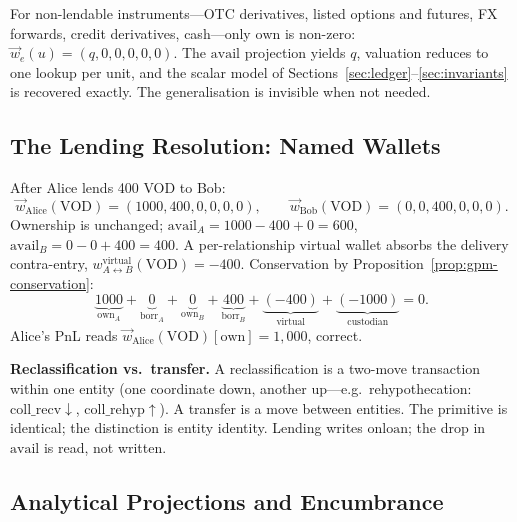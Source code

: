 \begin{remark}
For non-lendable instruments---OTC derivatives, listed options and futures, FX forwards, credit derivatives, cash---only $\mathrm{own}$ is non-zero: $\vec{w}_e(u) = (q,0,0,0,0,0)$. The $\mathrm{avail}$ projection yields $q$, valuation reduces to one lookup per unit, and the scalar model of Sections~\ref{sec:ledger}--\ref{sec:invariants} is recovered exactly. The generalisation is invisible when not needed.
\end{remark}

\subsection{The Lending Resolution: Named Wallets}
\label{sec:named-wallets}

After Alice lends 400 VOD to Bob:
\[
\vec{w}_{\mathrm{Alice}}(\text{VOD}) = (1000,400,0,0,0,0),\qquad \vec{w}_{\mathrm{Bob}}(\text{VOD}) = (0,0,400,0,0,0).
\]
Ownership is unchanged; $\mathrm{avail}_A = 1000-400+0 = 600$, $\mathrm{avail}_B = 0-0+400 = 400$. A per-relationship virtual wallet absorbs the delivery contra-entry, $w^{\mathrm{virtual}}_{A\leftrightarrow B}(\text{VOD}) = -400$. Conservation by Proposition~\ref{prop:gpm-conservation}:
\[
\underbrace{1000}_{\mathrm{own}_A} + \underbrace{0}_{\mathrm{borr}_A} + \underbrace{0}_{\mathrm{own}_B} + \underbrace{400}_{\mathrm{borr}_B} + \underbrace{(-400)}_{\text{virtual}} + \underbrace{(-1000)}_{\text{custodian}} = 0.
\]
Alice's PnL reads $\vec{w}_{\mathrm{Alice}}(\text{VOD})[\mathrm{own}] = 1{,}000$, correct.

\noindent\textbf{Reclassification vs.\ transfer.} A reclassification is a two-move transaction within one entity (one coordinate down, another up---e.g.\ rehypothecation: $\mathrm{coll\_recv}\downarrow$, $\mathrm{coll\_rehyp}\uparrow$). A transfer is a move between entities. The primitive is identical; the distinction is entity identity. Lending writes $\mathrm{onloan}$; the drop in $\mathrm{avail}$ is read, not written.

\subsection{Analytical Projections and Encumbrance}
\label{sec:projections}

